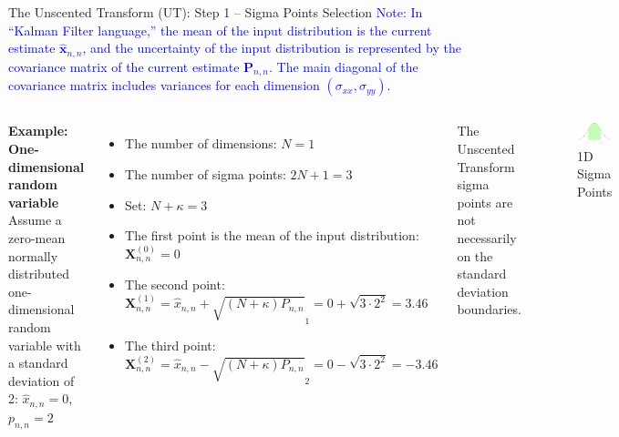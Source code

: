 \begin{frame}{The Unscented Transform (UT): Step 1 – Sigma Points Selection}
\textcolor{blue}{Note: In “Kalman Filter language,” the mean of the input distribution is the current estimate \(\hat{\mathbf{x}}_{n,n}\), and the uncertainty of the input distribution is represented by the covariance matrix of the current estimate \(\mathbf{P}_{n,n}\). The main diagonal of the covariance matrix includes variances for each dimension \((\sigma_{xx}, \sigma_{yy})\).}
\begin{columns}

\textbf{Example: One-dimensional random variable}
Assume a zero-mean normally distributed one-dimensional random variable with a
standard deviation of 2: \(\hat{x}_{n,n} = 0\), \(p_{n,n} = 2\)
\begin{itemize}
    \item The number of dimensions: \(N = 1\)
    \item The number of sigma points: \(2N + 1 = 3\)
    \item Set: \(N + \kappa = 3\)
    \item The first point is the mean of the input distribution: \(\mathbf{X}^{(0)}_{n,n} = 0\)
    \item The second point: \(\mathbf{X}^{(1)}_{n,n} = \hat{x}_{n,n} + \sqrt{(N + \kappa)P_{n,n}}_1 = 0 + \sqrt{3 \cdot 2^2} = 3.46\)
    \item The third point: \(\mathbf{X}^{(2)}_{n,n} = \hat{x}_{n,n} - \sqrt{(N + \kappa)P_{n,n}}_2 = 0 - \sqrt{3 \cdot 2^2} = -3.46\)
\end{itemize}

The Unscented Transform sigma points are not necessarily on the standard deviation
boundaries.
\begin{figure}
    \centering
    \includegraphics[width=0.95\linewidth]{Figures//Part3/1DSigmaPoints_examples.png}
    \caption{1D Sigma Points}
\end{figure}
\end{columns}
\end{frame}

